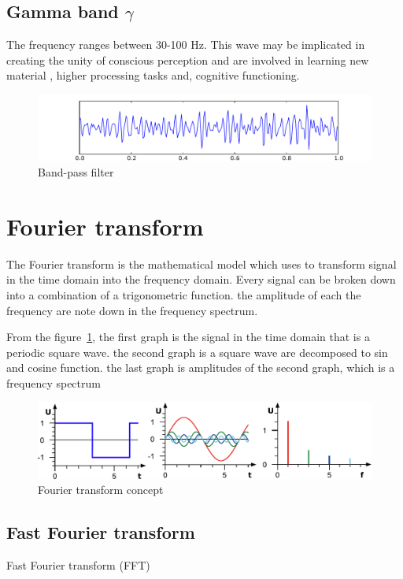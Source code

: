 \subsection{Gamma band $\gamma$} 
\hspace{1.5cm} The frequency ranges between 30-100 Hz. This wave may be implicated in creating the unity of conscious perception and are involved in learning new material , higher processing tasks and, cognitive functioning. 
\begin{figure}[ht]
	\centering
	\includegraphics[scale = 0.5]{chapter3/Eeg_gamma.pdf}
	\caption{Band-pass filter}
\end{figure}

\section{Fourier transform}
\hspace{1.5cm} The Fourier transform is the mathematical model which uses to transform signal in the time domain into the frequency domain. Every signal can be broken down into a combination of a trigonometric function.  the amplitude of each the frequency are note down in the frequency spectrum.\par
From the figure~\ref{fig:fourier}, the first graph is the signal in the time domain that is a periodic square wave. the second graph is a square wave are decomposed to sin and cosine function. the last graph is amplitudes of the second graph, which is a frequency spectrum \\
\begin{figure}[ht]
	\centering
	\includegraphics[scale = 0.75]{chapter3/ft.pdf}
	\caption{Fourier transform concept\cite{ft}}
    \label{fig:fourier}
\end{figure}

\subsection{Fast Fourier transform}
\hspace{1.5cm} Fast Fourier transform (FFT)

